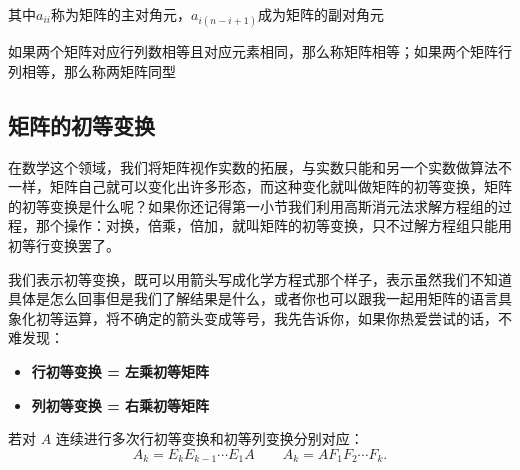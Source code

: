 \documentclass[UTF8]{ctexbook}
\begin{document}
其中$a_{ii}$称为矩阵的主对角元，$a_{i(n-i+1)}$成为矩阵的副对角元

如果两个矩阵对应行列数相等且对应元素相同，那么称矩阵相等；如果两个矩阵行列相等，那么称两矩阵同型

\subsection{矩阵的初等变换}

\label{Elementary_Transformation}
在数学这个领域，我们将矩阵视作实数的拓展，与实数只能和另一个实数做算法不一样，矩阵自己就可以变化出许多形态，而这种变化就叫做矩阵的初等变换，矩阵的初等变换是什么呢？如果你还记得第一小节我们利用高斯消元法求解方程组的过程，那个操作：对换，倍乘，倍加，就叫矩阵的初等变换，只不过解方程组只能用初等行变换罢了。

我们表示初等变换，既可以用箭头写成化学方程式那个样子，表示虽然我们不知道具体是怎么回事但是我们了解结果是什么，或者你也可以跟我一起用矩阵的语言具象化初等运算，将不确定的箭头变成等号，我先告诉你，如果你热爱尝试的话，不难发现：
\begin{itemize}
  
\item  \textbf{行初等变换 = 左乘初等矩阵}

\item \textbf{列初等变换 = 右乘初等矩阵}

\end{itemize}

若对 $A$ 连续进行多次行初等变换和初等列变换分别对应：
\[
A_k=E_kE_{k-1}\cdots E_1A \qquad A_k=AF_1F_2\cdots F_k.
\]
\end{document}
